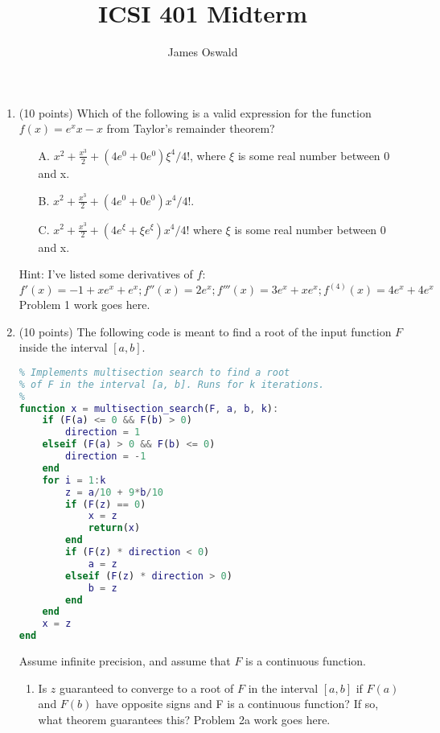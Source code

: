 \documentclass{article}
\author{James Oswald}
\title{ICSI 401 Midterm}
\begin{document}
\maketitle
\thispagestyle{fancy}

\begin{enumerate}
    \item (10 points) Which of the following is a valid expression for the function $f(x)=e^{x}x - x$ from Taylor’s remainder theorem?
    \begin{enumerate}
        \item[A.] $x^2 + \frac{x^3}{2} + (4e^0 + 0e^0)\xi^4/4!$, where $\xi$ is some real number between 0 and x.
        \item[B.] $x^2 + \frac{x^3}{2} + (4e^0 + 0e^0)x^4/4!$.
        \item[C.] $x^2 + \frac{x^3}{2} + (4e^\xi + \xi e^\xi)x^4/4!$ where $\xi$ is some real number between 0 and x.
    \end{enumerate}
    Hint: I’ve listed some derivatives of $f$: $f'(x) = -1 + xe^x + e^x; f''(x) = 2e^x; f'''(x) = 3e^x + xe^x; f^{(4)}(x)=4e^x+4e^x$
    \newline
    \newline
    Problem 1 work goes here.
    
    \item (10 points) The following code is meant to find a root of the input function $F$ inside the interval $[a, b]$.
    \begin{lstlisting}[language=MATLAB]
%
% Implements multisection search to find a root
% of F in the interval [a, b]. Runs for k iterations.
%
function x = multisection_search(F, a, b, k):
    if (F(a) <= 0 && F(b) > 0)
        direction = 1
    elseif (F(a) > 0 && F(b) <= 0)
        direction = -1
    end
    for i = 1:k
        z = a/10 + 9*b/10
        if (F(z) == 0)
            x = z
            return(x)
        end
        if (F(z) * direction < 0)
            a = z
        elseif (F(z) * direction > 0)
            b = z
        end
    end
    x = z
end
    \end{lstlisting}
    Assume infinite precision, and assume that $F$ is a continuous function.
    \begin{enumerate}
        \item Is $z$ guaranteed to converge to a root of $F$ in the interval $[a, b]$ if $F(a)$ and $F(b)$ have opposite signs and F is a continuous function? If so, what theorem guarantees this?
        \newline
        \newline
        Problem 2a work goes here.
        

\end{enumerate}
\end{enumerate}
\end{document}
